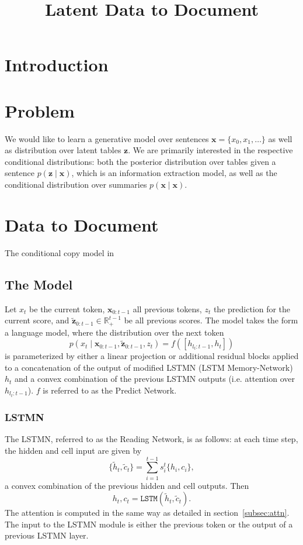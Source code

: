 \documentclass{article}
\title{Latent Data to Document}
\newcommand{\bx}{\mathbf{x}}
\newcommand{\bz}{\mathbf{z}}
\newcommand{\R}{\mathbb{R}}
\begin{document}
\maketitle

\section{Introduction}

\section{Problem}
We would like to learn a generative model
over sentences $\bx = \{x_0, x_1, \ldots\}$ as well as distribution over latent tables $\bz$.  
We are primarily interested in the respective conditional distributions:
both the posterior distribution over tables given a sentence $p(\bz\mid\bx)$,
which is an information extraction model,
as well as the conditional distribution over summaries $p(\bx\mid\bx)$.


\section{Data to Document}
The conditional copy model in \citet{wiseman2017d2t}

\subsection{The Model}
Let $x_t$ be the current token, $\bx_{0:t-1}$ all previous tokens, $z_t$ the prediction for the current score,
and $\tilde{\bz}_{0:t-1}\in\R^{t-1}_+$ be all previous scores.
The model takes the form a language model, where
the distribution over the next token
$$p(x_t\mid \bx_{0:t-1}, \tilde{\bz}_{0:t-1},z_t) = f([h_{l_t:t-1},h_t])$$
is parameterized by either a linear projection or additional residual blocks
applied to a concatenation of the output of modified LSTMN (LSTM Memory-Network) $h_t$
and a convex combination of the previous LSTMN outputs (i.e. attention over $h_{l_t:t-1}$).
$f$ is referred to as the Predict Network.

\subsubsection{LSTMN}
\label{subsec:lstmn}
The LSTMN, referred to as the Reading Network, is as follows:
at each time step, the hidden and cell input are given by
$$\{\tilde{h}_t,\tilde{c}_t\} = \sum_{i=1}^{t-1} s_i^t\{h_i,c_i\},$$
a convex combination of the previous hidden and cell outputs.
Then $$h_t,c_t = \texttt{LSTM}(\tilde{h}_t,\tilde{c}_t).$$
The attention is computed in the same way as detailed in section~\ref{subsec:attn}.
The input to the LSTMN module is either the previous token or the
output of a previous LSTMN layer.
\end{document}
